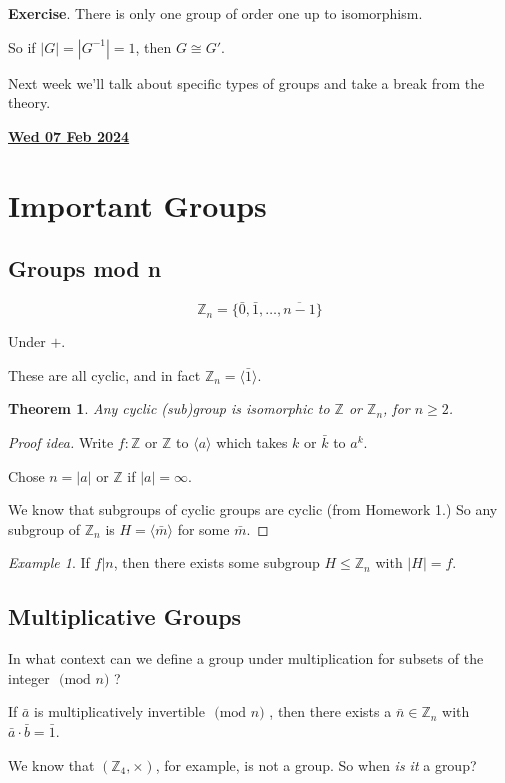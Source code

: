 \documentclass[12pt]{article}
\renewcommand{\date}[1]{\underline{\bf #1}}
\def\Z{{\mathbb Z}}
\newcommand{\lr}[1]{\langle #1 \rangle}
\renewcommand{\mod}[1]{\text{ (mod $#1$) }}
\newtheorem{theorem}{Theorem}
\theoremstyle{remark}
\theoremstyle{remark}
\theoremstyle{remark}
\newtheorem{example}{Example}
\theoremstyle{remark}
\theoremstyle{remark}
\begin{document}
{\bf Exercise}. There is only one group of order one up to isomorphism.

So if $|G| = |G^{-1}| = 1$, then $G \cong G'$.

Next week we'll talk about specific types of groups and take a break from the
theory.

\date{Wed 07 Feb 2024}

\section{Important Groups}

\subsection{Groups mod n}

\[
	\Z_n = \{\bar 0, \bar 1, \dots, \overline{n - 1}\}
\]

Under $+$.

These are all cyclic, and in fact $\Z_n = \lr {\bar 1}$.

\begin{theorem}
  Any cyclic (sub)group is isomorphic to $\Z$ or $\Z_n$, for $n \ge 2$.
\end{theorem}

\begin{proof}[Proof idea]
  Write $f: \Z$ or $\Z$ to $\lr {a}$ which takes $k$ or $\bar k$ to $a^k$.

  Chose $n = |a|$ or $\Z$ if $|a| = \infty$.

  We know that subgroups of cyclic groups are cyclic (from Homework 1.) So any
  subgroup of $\Z_n$ is $H = \lr{\bar m}$ for some $\bar m$.
\end{proof}

\begin{example}
	If $f | n$, then there exists some subgroup $H \le \Z_n$ with $|H| = f$.
\end{example}

\subsection{Multiplicative Groups}

In what context can we define a group under multiplication for subsets of the
integer $\mod n$?

If $\bar a$ is multiplicatively invertible $\mod n$, then there exists a
$\bar n \in \Z_n$ with $\bar a \cdot \bar b = \bar 1$.

We know that $(\Z_4, \times)$, for example, is not a group. So when {\it is it}
a group?
\end{document}
